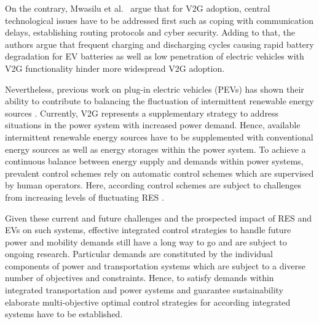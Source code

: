 On the contrary, Mwasilu et al.~\cite{mwasilu2014electric} argue that for V2G adoption, central technological issues have to be addressed first such as coping with communication delays, establishing routing protocols and cyber security. Adding to that, the authors argue that frequent charging and discharging cycles causing rapid battery degradation for EV batteries as well as low penetration of electric vehicles with V2G functionality hinder more widespread V2G adoption.

Nevertheless, previous work on plug-in electric vehicles (PEVs) has shown their ability to contribute to balancing the fluctuation of intermittent renewable energy sources \cite{dallinger2012grid}. Currently, V2G represents a supplementary strategy to address situations in the power system with increased power demand. Hence, available intermittent renewable energy sources have to be supplemented with conventional energy sources as well as energy storages within the power system. To achieve a continuous balance between energy supply and demands within power systems, prevalent control schemes rely on automatic control schemes which are supervised by human operators. Here, according control schemes are subject to challenges from increasing levels of fluctuating RES \cite{heussen2012unified}.

Given these current and future challenges and the prospected impact of RES and EVs on such systems, effective integrated control strategies to handle future power and mobility demands still have a long way to go and are subject to ongoing research. Particular demands are constituted by the individual components of power and transportation systems which are subject to a diverse number of objectives and constraints. Hence, to satisfy demands within integrated transportation and power systems and guarantee sustainability elaborate multi-objective optimal control strategies for according integrated systems have to be established.

%
